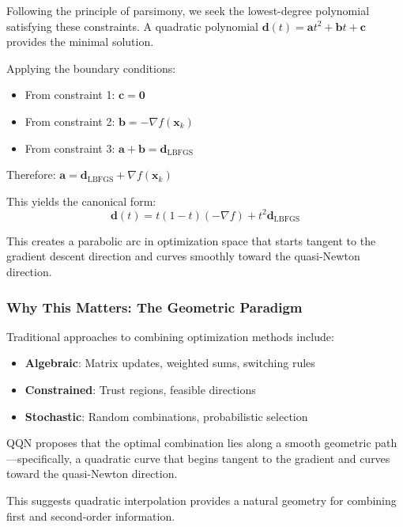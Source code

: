 Following the principle of parsimony, we seek the lowest-degree polynomial satisfying these constraints.
A quadratic polynomial \(\mathbf{d}(t) = \mathbf{a}t^2 + \mathbf{b}t + \mathbf{c}\) provides the minimal solution.

Applying the boundary conditions:

\begin{itemize}
\tightlist
\item
  From constraint 1: \(\mathbf{c} = \mathbf{0}\)
\item
  From constraint 2: \(\mathbf{b} = -\nabla f(\mathbf{x}_k)\)
\item
  From constraint 3: \(\mathbf{a} + \mathbf{b} = \mathbf{d}_{\text{LBFGS}}\)
\end{itemize}

Therefore: \(\mathbf{a} = \mathbf{d}_{\text{LBFGS}} + \nabla f(\mathbf{x}_k)\)

This yields the canonical form:
\[\mathbf{d}(t) = t(1-t)(-\nabla f) + t^2 \mathbf{d}_{\text{LBFGS}}\]

This creates a parabolic arc in optimization space that starts tangent to the gradient descent direction and curves smoothly toward the quasi-Newton direction.

\hypertarget{why-this-matters-the-geometric-paradigm}{%
\subsubsection{Why This Matters: The Geometric Paradigm}\label{why-this-matters-the-geometric-paradigm}}

Traditional approaches to combining optimization methods include:

\begin{itemize}
\tightlist
\item
  \textbf{Algebraic}: Matrix updates, weighted sums, switching rules
\item
  \textbf{Constrained}: Trust regions, feasible directions
\item
  \textbf{Stochastic}: Random combinations, probabilistic selection
\end{itemize}

QQN proposes that the optimal combination lies along a smooth geometric path---specifically, a quadratic curve that begins tangent to the gradient and curves toward the quasi-Newton direction.

This suggests quadratic interpolation provides a natural geometry for combining first and second-order information.

